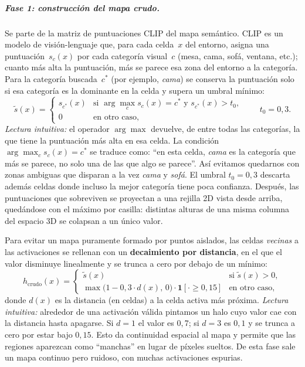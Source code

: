 \documentclass[11pt,fleqn,openany]{book} %
\begin{document}
\subparagraph{Fase 1: construcción del mapa crudo.} Se parte de la matriz de puntuaciones CLIP del mapa semántico. CLIP es un modelo de visión-lenguaje que, para cada celda~$x$ del entorno, asigna una puntuación~$s_c(x)$ por cada categoría visual~$c$ (mesa, cama, sofá, ventana, etc.); cuanto más alta la puntuación, más se parece esa zona del entorno a la categoría. Para la categoría buscada~$c^{*}$ (por ejemplo, \emph{cama}) se conserva la puntuación solo si esa categoría es la dominante en la celda y supera un umbral mínimo:
%
\begin{equation}
\tilde s(x) =
\begin{cases}
s_{c^{*}}(x) & \text{si } \arg\max_{c} s_c(x) = c^{*} \text{ y } s_{c^{*}}(x) > t_0,\\
0 & \text{en otro caso,}
\end{cases}
\qquad t_0 = 0{,}3.
\label{eq:argmax_filter}
\end{equation}
%
\emph{Lectura intuitiva:} el operador $\arg\max$ devuelve, de entre todas las categorías, la que tiene la puntuación más alta en esa celda. La condición $\arg\max_c s_c(x) = c^{*}$ se traduce como: ``en esta celda, \emph{cama} es la categoría que más se parece, no solo una de las que algo se parece''. Así evitamos quedarnos con zonas ambiguas que disparan a la vez \emph{cama} y \emph{sofá}. El umbral $t_0=0{,}3$ descarta además celdas donde incluso la mejor categoría tiene poca confianza. Después, las puntuaciones que sobreviven se proyectan a una rejilla 2D vista desde arriba, quedándose con el máximo por casilla: distintas alturas de una misma columna del espacio 3D se colapsan a un único valor.

Para evitar un mapa puramente formado por puntos aislados, las celdas \emph{vecinas} a las activaciones se rellenan con un \textbf{decaimiento por distancia}, en el que el valor disminuye linealmente y se trunca a cero por debajo de un mínimo:
%
\begin{equation}
h_{\text{crudo}}(x) =
\begin{cases}
\tilde s(x) & \text{si } \tilde s(x) > 0,\\
\max\bigl(1 - 0{,}3 \cdot d(x),\,0\bigr) \cdot \mathbf{1}[\cdot \geq 0{,}15] & \text{en otro caso,}
\end{cases}
\label{eq:dist_decay}
\end{equation}
%
donde $d(x)$ es la distancia (en celdas) a la celda activa más próxima. \emph{Lectura intuitiva:} alrededor de una activación válida pintamos un halo cuyo valor cae con la distancia hasta apagarse. Si $d=1$ el valor es $0{,}7$; si $d=3$ es $0{,}1$ y se trunca a cero por estar bajo $0{,}15$. Esto da continuidad espacial al mapa y permite que las regiones aparezcan como ``manchas'' en lugar de píxeles sueltos. De esta fase sale un mapa continuo pero ruidoso, con muchas activaciones espurias.
\end{document}
